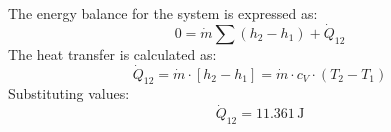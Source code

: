 The energy balance for the system is expressed as:  
\[
0 = \dot{m} \sum (h_2 - h_1) + \dot{Q}_{12}
\]  
The heat transfer is calculated as:  
\[
\dot{Q}_{12} = \dot{m} \cdot \left[h_2 - h_1\right] = \dot{m} \cdot c_V \cdot (T_2 - T_1)
\]  
Substituting values:  
\[
\dot{Q}_{12} = 11.361 \, \text{J}
\]